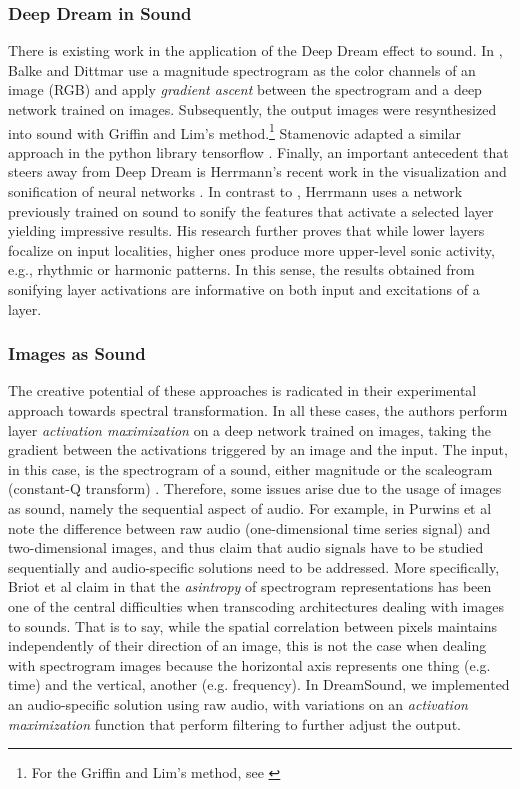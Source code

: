 \documentclass[a4paper,10pt,oneside]{article}
\begin{document}
\begin{sloppy}
\subsubsection{Deep Dream in Sound}
There is existing work in the application of the Deep Dream effect \cite{Mordvintsev2015} to sound. In \cite{Balke2015}, Balke and Dittmar use a magnitude spectrogram as the color channels of an image (RGB) and apply \textit{gradient ascent} between the spectrogram and a deep network trained on images. Subsequently, the output images were resynthesized into sound with Griffin and Lim's method.\footnote{For the Griffin and Lim's method, see \cite{Lim1983}} Stamenovic adapted a similar approach in the python library tensorflow \cite{Stamenovic2016}. Finally, an important antecedent that steers away from Deep Dream is Herrmann's recent work in the visualization and sonification of neural networks \cite{pmlr-v123-herrmann20a}. In contrast to \cite{Balke2015,Stamenovic2016}, Herrmann uses a network previously trained on sound to sonify the features that activate a selected layer yielding impressive results. His research further proves that while lower layers focalize on input localities, higher ones produce more upper-level sonic activity, e.g., rhythmic or harmonic patterns. In this sense, the results obtained from sonifying layer activations are informative on both input and excitations of a layer. 

\subsubsection{Images as Sound}
The creative potential of these approaches is radicated in their experimental approach towards spectral transformation. In all these cases, the authors perform layer \textit{activation maximization} on a deep network trained on images, taking the gradient between the activations triggered by an image and the input. The input, in this case, is the spectrogram of a sound, either magnitude \cite{Balke2015,Stamenovic2016} or the scaleogram (constant-Q transform) \cite{pmlr-v123-herrmann20a}. Therefore, some issues arise due to the usage of images as sound, namely the sequential aspect of audio. For example, in \cite{2019Purwins} Purwins et al note the difference between raw audio (one-dimensional time series signal) and two-dimensional images, and thus claim that audio signals have to be studied sequentially and audio-specific solutions need to be addressed. More specifically, Briot et al claim in \cite{Briot2017}that the \textit{asintropy} of spectrogram representations has been one of the central difficulties when transcoding architectures dealing with images to sounds. That is to say, while the spatial correlation between pixels maintains independently of their direction of an image, this is not the case when dealing with spectrogram images because the horizontal axis represents one thing (e.g. time) and the vertical, another (e.g. frequency). In DreamSound,  we implemented an audio-specific solution using raw audio, with variations on an \textit{activation maximization} function that perform filtering to further adjust the output. 


\end{sloppy}
\end{document}

